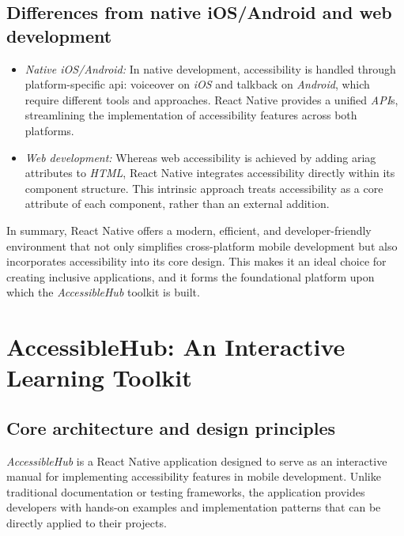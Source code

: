 \subsection{Differences from native iOS/Android and web development}
\begin{itemize}
    \item \textit{Native iOS/Android:}  
    In native development, accessibility is handled through platform-specific \acrshort{api}: \gls{voiceover} on \textit{iOS} and \gls{talkback} on \textit{Android}, which require different tools and approaches. React Native provides a unified \textit{API}s, streamlining the implementation of accessibility features across both platforms.
    
    \item \textit{Web development:}  
    Whereas web accessibility is achieved by adding \gls{ariag} attributes to \textit{HTML}, React Native integrates accessibility directly within its component structure. This intrinsic approach treats accessibility as a core attribute of each component, rather than an external addition.
\end{itemize}

In summary, React Native offers a modern, efficient, and developer-friendly environment that not only simplifies cross-platform mobile development but also incorporates accessibility into its core design. This makes it an ideal choice for creating inclusive applications, and it forms the foundational platform upon which the \textit{AccessibleHub} toolkit is built.

\section{AccessibleHub: An Interactive Learning Toolkit}
\label{sec:accessiblehub}

\subsection{Core architecture and design principles}
\label{sec:accessiblehub-architecture-design}

\textit{AccessibleHub} is a React Native application designed to serve as an interactive manual for implementing accessibility features in mobile development. Unlike traditional documentation or testing frameworks, the application provides developers with hands-on examples and implementation patterns that can be directly applied to their projects.

